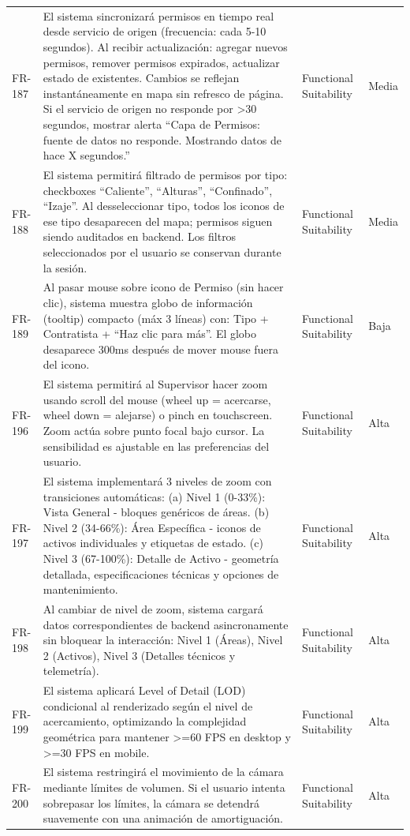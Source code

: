 \begin{longtable}{>{\raggedright\arraybackslash}p{} >{\raggedright\arraybackslash}p{} >{\raggedright\arraybackslash}p{} >{\raggedright\arraybackslash}p{}}
FR-187 & El sistema sincronizará permisos en tiempo real desde servicio de origen (frecuencia: cada 5-10 segundos). Al recibir actualización: agregar nuevos permisos, remover permisos expirados, actualizar estado de existentes. Cambios se reflejan instantáneamente en mapa sin refresco de página. Si el servicio de origen no responde por >30 segundos, mostrar alerta ``Capa de Permisos: fuente de datos no responde. Mostrando datos de hace X segundos.'' & Functional Suitability & Media \\
FR-188 & El sistema permitirá filtrado de permisos por tipo: checkboxes ``Caliente'', ``Alturas'', ``Confinado'', ``Izaje''. Al desseleccionar tipo, todos los iconos de ese tipo desaparecen del mapa; permisos siguen siendo auditados en backend. Los filtros seleccionados por el usuario se conservan durante la sesión. & Functional Suitability & Media \\
FR-189 & Al pasar mouse sobre icono de Permiso (sin hacer clic), sistema muestra globo de información (tooltip) compacto (máx 3 líneas) con: Tipo + Contratista + ``Haz clic para más''. El globo desaparece 300ms después de mover mouse fuera del icono. & Functional Suitability & Baja \\
FR-196 & El sistema permitirá al Supervisor hacer zoom usando scroll del mouse (wheel up = acercarse, wheel down = alejarse) o pinch en touchscreen. Zoom actúa sobre punto focal bajo cursor. La sensibilidad es ajustable en las preferencias del usuario. & Functional Suitability & Alta \\
FR-197 & El sistema implementará 3 niveles de zoom con transiciones automáticas: (a) Nivel 1 (0-33\%): Vista General - bloques genéricos de áreas. (b) Nivel 2 (34-66\%): Área Específica - iconos de activos individuales y etiquetas de estado. (c) Nivel 3 (67-100\%): Detalle de Activo - geometría detallada, especificaciones técnicas y opciones de mantenimiento. & Functional Suitability & Alta \\
FR-198 & Al cambiar de nivel de zoom, sistema cargará datos correspondientes de backend asincronamente sin bloquear la interacción: Nivel 1 (Áreas), Nivel 2 (Activos), Nivel 3 (Detalles técnicos y telemetría). & Functional Suitability & Alta \\
FR-199 & El sistema aplicará Level of Detail (LOD) condicional al renderizado según el nivel de acercamiento, optimizando la complejidad geométrica para mantener >=60 FPS en desktop y >=30 FPS en mobile. & Functional Suitability & Alta \\
FR-200 & El sistema restringirá el movimiento de la cámara mediante límites de volumen. Si el usuario intenta sobrepasar los límites, la cámara se detendrá suavemente con una animación de amortiguación. & Functional Suitability & Alta \\

\end{longtable}
